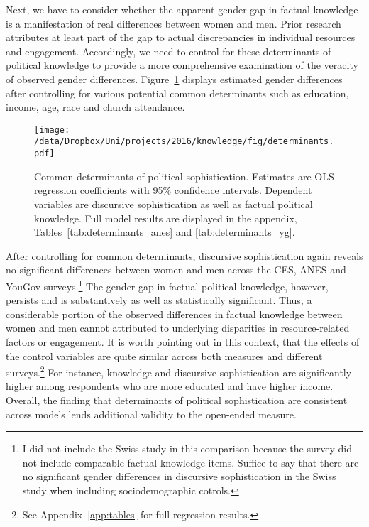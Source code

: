 \clearpage

Next, we have to consider whether the apparent gender gap in factual knowledge is a manifestation of real differences between women and men. Prior research attributes at least part of the gap to actual discrepancies in individual resources and engagement. Accordingly, we need to control for these determinants of political knowledge to provide a more comprehensive examination of the veracity of observed gender differences. Figure~\ref{fig:determinants} displays estimated gender differences after controlling for various potential common determinants such as education, income, age, race and church attendance.

\begin{figure}[h]\centering
\texttt{[image: /data/Dropbox/Uni/projects/2016/knowledge/fig/determinants.pdf]}
\caption[Common determinants of political sophistication]{Common determinants of political sophistication. Estimates are OLS regression coefficients with 95\% confidence intervals. Dependent variables are discursive sophistication as well as factual political knowledge. Full model results are displayed in the appendix, Tables~\ref{tab:determinants_anes} and \ref{tab:determinants_yg}.}\label{fig:determinants}
\end{figure}

After controlling for common determinants, discursive sophistication again reveals no significant differences between women and men across the CES, ANES and YouGov surveys.\footnote{I did not include the Swiss study in this comparison because the survey did not include comparable factual knowledge items. Suffice to say that there are no significant gender differences in discursive sophistication in the Swiss study when including sociodemographic cotrols.} The gender gap in factual political knowledge, however, persists and is substantively as well as statistically significant. Thus, a considerable portion of the observed differences in factual knowledge between women and men cannot attributed to underlying disparities in resource-related factors or engagement. It is worth pointing out in this context, that the effects of the control variables are quite similar across both measures and different surveys.\footnote{See Appendix~\ref{app:tables} for full regression results.} For instance, knowledge and discursive sophistication are significantly higher among respondents who are more educated and have higher income.%
Overall, the finding that determinants of political sophistication are consistent across models lends additional validity to the open-ended measure.

